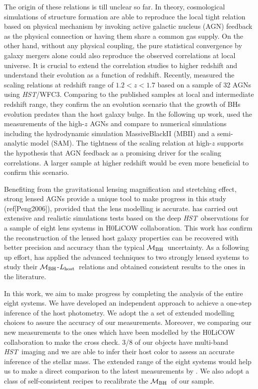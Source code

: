 \documentclass[fleqn,usenatbib]{mnras}
\newcommand{\hst}{{\it HST}}
\newcommand{\mbh}{$\mathcal M_{\rm BH}$}
\newcommand{\lhost}{$L_{\rm host}$}
\begin{document}
The origin of these relations is till unclear so far. In theory, cosmological simulations of structure formation are able to reproduce the local tight relation based on physical mechanism by invoking active galactic nucleus (AGN) feedback as the physical connection or having them share a common gas supply. On the other hand, without any physical coupling, the pure statistical convergence by galaxy mergers alone could also reproduce the observed correlations at local universe. It is crucial to extend the correlation studies to higher redshift and understand their evolution as a function of redshift. Recently, \citet{Ding2020} measured the scaling relations at redshift range of $1.2<z<1.7$ based on a sample of 32 AGNs using \hst/WFC3. Comparing to the published samples at local and intermediate redshift range, they confirm the an evolution scenario that the growth of BHs evolution predates than the host galaxy bulge. In the following up work, \citet{Ding2020b} used the measurements of the high-$z$ AGNs and compare to numerical simulations including the hydrodynamic simulation MassiveBlackII (MBII) and a semi-analytic model (SAM). The tightness of the scaling relation at high-$z$ supports the hypothesis that AGN feedback as a promising driver for the scaling correlations. A larger sample at higher redshift would be even more beneficial to confirm this scenario.

Benefiting from the gravitational lensing magnification and stretching effect, strong lensed AGNs provide a unique tool to make progress in this study (ref[Peng2006]), 
provided that the lens modelling is accurate. \citet{Ding2017a} has carried out extensive and realistic simulations tests based on the deep \hst\ observations for a sample of eight lens systems in H0LiCOW collaboration. This work has confirm the reconstruction of the lensed host galaxy properties can be recovered with better precision and accuracy than the typical \mbh\ uncertainty. As a following up effort, \citet{Ding2017b} has applied the advanced techniques to two strongly lensed systems to study their \mbh-\lhost\ relations and obtained consistent results to the ones in the literature.

In this work, we aim to make progress by completing the analysis of the entire eight systems. We have developed an independent approach to achieve a one-step inference of the host photometry. We adopt the a set of extended modelling choices to assure the accuracy of our measurements. Moreover, we comparing our new measurements to the ones which have been modelled by the H0LiCOW collaboration to make the cross check. 3/8 of our objects have multi-band \hst\ imaging and we are able to infer their host color to assess an accurate inference of the stellar mass. The extended range of the eight systems would help us to make a direct comparison to the latest measurements by \citet{Ding2020}. We also adopt a class of self-consistent recipes to recalibrate the \mbh\ of our sample.
\end{document}
